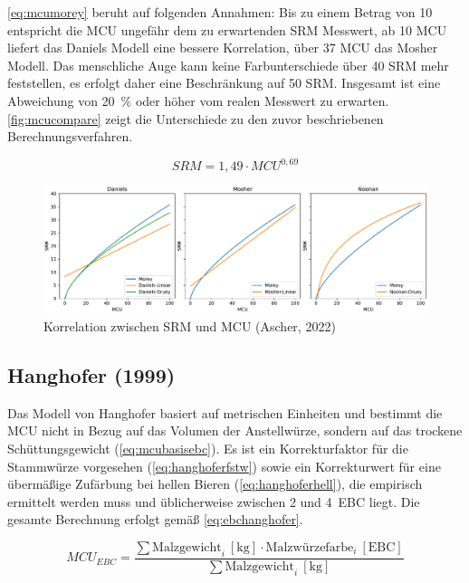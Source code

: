 \documentclass[a4paper,parskip=half]{scrartcl}
\newcommand{\MCUL}{\mathit{MCU}}
\newcommand{\MCUEBC}{\mathit{MCU}_{EBC}}
\newcommand{\SRM}{\mathit{SRM}}
\newcommand{\uebc}{\:[\textrm{EBC}]}
\newcommand{\ukg}{\:[\textrm{kg}]}
\begin{document}
\autoref{eq:mcumorey} beruht auf folgenden Annahmen: Bis zu einem Betrag von 10 entspricht die MCU ungefähr dem zu erwartenden SRM Messwert, ab 10 MCU liefert das Daniels Modell eine bessere Korrelation, über 37 MCU das Mosher Modell. Das menschliche Auge kann keine Farbunterschiede über 40 SRM mehr feststellen, es erfolgt daher eine Beschränkung auf 50 SRM. Insgesamt ist eine Abweichung von 20~\% oder höher vom realen Messwert zu erwarten. \autoref{fig:mcucompare} zeigt die Unterschiede zu den zuvor beschriebenen Berechnungsverfahren. \parencite{Morey2004}

\begin{equation}
\SRM = 1,49 \cdot \MCUL^{0,69}
\label{eq:mcumorey}
\end{equation}

\begin{figure}[h]
\centering
\includegraphics[width=14cm]{graph_srm.pdf}
\caption{Korrelation zwischen SRM und MCU (Ascher, 2022)}
\label{fig:mcucompare}
\end{figure}

\subsection*{Hanghofer (1999)}

Das Modell von Hanghofer basiert auf metrischen Einheiten und bestimmt die MCU nicht in Bezug auf das Volumen der Anstellwürze, sondern auf das trockene Schüttungsgewicht (\autoref{eq:mcubasisebc}). Es ist ein Korrekturfaktor für die Stammwürze vorgesehen (\autoref{eq:hanghoferfstw}) sowie ein Korrekturwert für eine übermäßige Zufärbung bei hellen Bieren (\autoref{eq:hanghoferhell}), die empirisch ermittelt werden muss und üblicherweise zwischen 2 und 4~EBC liegt. Die gesamte Berechnung erfolgt gemäß \autoref{eq:ebchanghofer}. \parencite[76]{Hanghofer1999}

\begin{equation}
\MCUEBC = \frac{\sum \text{Malzgewicht}_i \ukg \cdot \text{Malzwürzefarbe}_i \uebc}{\sum \text{Malzgewicht}_i \ukg} 
\label{eq:mcubasisebc}
\end{equation}
\end{document}
